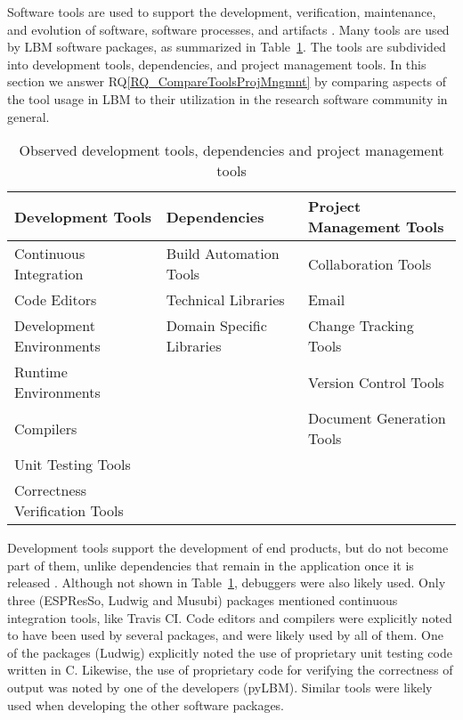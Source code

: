 \documentclass[runningheads]{llncs}
\newcommand{\rqref}[1]{RQ\ref{#1}}
\begin{document}
Software tools are used to support the development, verification, maintenance,
and evolution of software, software processes, and artifacts \cite[p.\
501]{GhezziEtAl2003}. Many tools are used by LBM software packages, as
summarized in Table~\ref{tbl_tools}.  The tools are subdivided into development
tools, dependencies, and project management tools.  In this section we answer
\rqref{RQ_CompareToolsProjMngmnt} by comparing aspects of the tool usage in LBM
to their utilization in the research software community in general.

\begin{table}
	\begin{center}
	\begin{tabular}{ p{5.3 cm} p{4.9 cm} p{5 cm}}
	\toprule
	\textbf{Development Tools} & \textbf{Dependencies} & \textbf{Project
	Management Tools} \\
	\midrule
	Continuous Integration & Build Automation Tools & Collaboration Tools\\
	Code Editors & Technical Libraries & Email\\
	Development Environments & Domain Specific Libraries & Change Tracking Tools\\
	Runtime Environments &  & Version Control Tools\\
	Compilers &  & Document Generation Tools\\
	Unit Testing Tools &  & \\
	Correctness Verification Tools &  & \\
	\bottomrule
	\end{tabular}
	\caption{Observed development tools, dependencies and project management
	tools} \label{tbl_tools}
	\end{center}
\end{table}

Development tools support the development of end products, but do not become
part of them, unlike dependencies that remain in the application once it is
released \cite[p.\ 506]{GhezziEtAl2003}. Although not shown in
Table~\ref{tbl_tools}, debuggers were also likely used.  Only three (ESPResSo,
Ludwig and Musubi) packages mentioned continuous integration tools, like Travis
CI. Code editors and compilers were explicitly noted to have been used by
several packages, and were likely used by all of them. One of the packages
(Ludwig) explicitly noted the use of proprietary unit testing code written in C.
Likewise, the use of proprietary code for verifying the correctness of output
was noted by one of the developers (pyLBM). Similar tools were likely used when
developing the other software packages.
\end{document}
